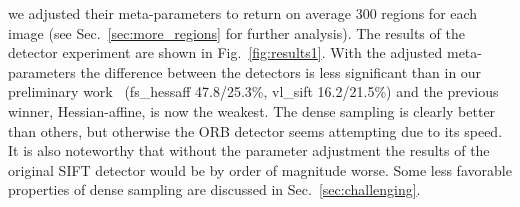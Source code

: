 \documentclass[review]{elsarticle}
\begin{document}
we adjusted their meta-parameters to return on average 300 regions for
each image (see Sec.~\ref{sec:more_regions} for further analysis).
The results of the detector experiment  are shown in Fig.~\ref{fig:results1}.
With the adjusted meta-parameters the difference between the detectors
is less significant than in our preliminary work~\cite{LanKanKam:2012}
(fs\_hessaff 47.8/25.3\%, vl\_sift 16.2/21.5\%) and
the previous winner, Hessian-affine, is now the weakest. The dense sampling
is clearly better than others, but otherwise the ORB detector seems
attempting due to its speed. It is also noteworthy that without the parameter
adjustment the results of the original SIFT detector would be by order of
magnitude worse.
Some less favorable
properties of dense sampling are discussed in Sec.~\ref{sec:challenging}.
\end{document}
